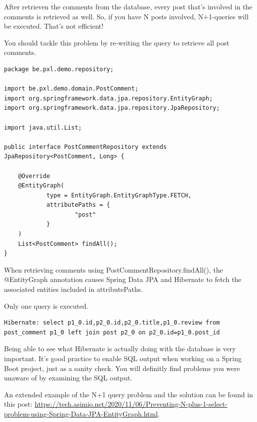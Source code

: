 After retrieven the comments from the database, every post that's involved in the comments is retrieved as well. So, if you have N posts involved, N+1-queries will be executed. That's not efficient!

You should tackle this problem by re-writing the query to retrieve all post comments.

\begin{lstlisting}
package be.pxl.demo.repository;

import be.pxl.demo.domain.PostComment;
import org.springframework.data.jpa.repository.EntityGraph;
import org.springframework.data.jpa.repository.JpaRepository;

import java.util.List;

public interface PostCommentRepository extends JpaRepository<PostComment, Long> {

    @Override
    @EntityGraph(
            type = EntityGraph.EntityGraphType.FETCH,
            attributePaths = {
                    "post"
            }
    )
    List<PostComment> findAll();
}
\end{lstlisting}

When retrieving comments using PostCommentRepository.findAll(), the @EntityGraph annotation causes Spring Data JPA and Hibernate to fetch the associated entities included in attributePaths.

Only one query is executed.

\begin{lstlisting}
Hibernate: select p1_0.id,p2_0.id,p2_0.title,p1_0.review from post_comment p1_0 left join post p2_0 on p2_0.id=p1_0.post_id
\end{lstlisting}

Being able to see what Hibernate is actually doing with the database is very important.
It's good practice to enable SQL output when working on a Spring Boot project, just as a sanity check. 
You will definitly find problems you were unaware of by examining the SQL output.

An extended example of the N+1 query problem and the solution can be found in this post: \url{https://tech.asimio.net/2020/11/06/Preventing-N-plus-1-select-problem-using-Spring-Data-JPA-EntityGraph.html}.





